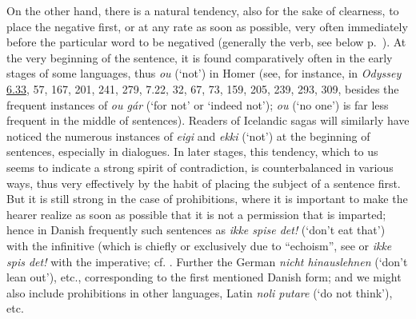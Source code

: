 \label{para:naturaltendency}On the other hand, there is a natural tendency, also for the sake of clearness, to place the negative first, or at any rate as soon as possible, very often immediately before the particular word to be negatived (generally the verb, see below p.~\pageref{rapid_sketch}). At the very beginning of the sentence, it is found comparatively often in the early stages of some languages, thus \textit{ou} (`not') in Homer (see, for instance, in \textit{Odyssey} \href{http://www.perseus.tufts.edu/hopper/text?doc=Hom.+Od.+6.33&fromdoc=Perseus%3Atext%3A1999.01.0135}{6.33}, 
57, 167, 201, 241, 279, 7.22, 32, 67, 73, 159, 205, 239, 293, 309, besides the frequent instances of \textit{ou gár} (`for not' or `indeed not'); \textit{ou} (`no one') is far less frequent in the middle of sentences).%
Readers of Icelandic sagas will similarly have noticed the numerous instances of \textit{eigi} and \textit{ekki} (`not') at the beginning of sentences, especially in dialogues. %
In later stages, this tendency, which to us seems to indicate a strong spirit of contradiction, is counterbalanced in various ways, thus very effectively by the habit of placing the subject of a sentence first. But it is still strong in the case of prohibitions, where it is important to make the hearer realize as soon as possible that it is not a permission that is imparted; hence in Danish frequently such sentences as \textit{ikke spise det!} (`don't eat that') with the infinitive (which is chiefly or exclusively due to ``echoism'', see \citet[164]{jespersen1916nutidssprog} or \textit{ikke spis det!} with the imperative; cf. . Further the German \textit{nicht hinauslehnen} (`don't lean out'), etc., corresponding to the first mentioned Danish form; and we might also include prohibitions in other languages, Latin \textit{noli putare} (`do not think'), etc.

